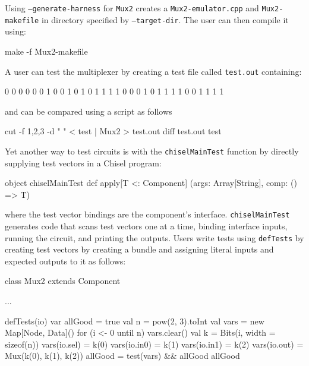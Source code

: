 \documentclass[10pt,twocolumn]{article}
\def\code#1{{\small\tt #1}}
\begin{document}
Using \code{--generate-harness} for \code{Mux2}
creates a \code{Mux2-emulator.cpp}  and \code{Mux2-makefile} in directory
specified by \code{--target-dir}.  The user can then compile it using:

\begin{scala}
make -f Mux2-makefile
\end{scala}

\noindent

A user can test the multiplexer by creating a test file called
\code{test.out} containing:
\begin{scala}
0 0 0 0
0 0 1 0
0 1 0 1
0 1 1 1
1 0 0 0
1 0 1 1
1 1 0 0
1 1 1 1
\end{scala}

\noindent
and can be compared using a script as follows

\begin{scala}
cut -f 1,2,3 -d " " < test | Mux2 > test.out
diff test.out test
\end{scala}
 
Yet another way to test circuits is with the \code{chiselMainTest}
function by directly supplying test vectors in a Chisel program:

\begin{scala}
object chiselMainTest {
  def apply[T <: Component]
    (args: Array[String], comp: () => T)
}
\end{scala}

\noindent
where the test vector bindings are the component's interface.
\code{chiselMainTest} generates code that scans test vectors one at a
time, binding interface inputs,  running the circuit, and printing the outputs.
Users write tests using \code{defTests} by creating test
vectors by creating a bundle and assigning literal inputs and expected
outputs to it as follows:
\begin{scala}
class Mux2 extends Component {
 ...

 defTests(io) {  
    var allGood = true
    val n = pow(2, 3).toInt
    val vars = new Map[Node, Data]()
    for (i <- 0 until n) {
      vars.clear()
      val k  = Bits(i, width = sizeof(n)) 
      vars(io.sel) = k(0) 
      vars(io.in0) = k(1) 
      vars(io.in1) = k(2) 
      vars(io.out) = Mux(k(0), k(1), k(2)) 
      allGood = test(vars) && allGood
    }
    allGood
  }
}
\end{scala}

% 
\end{document}
